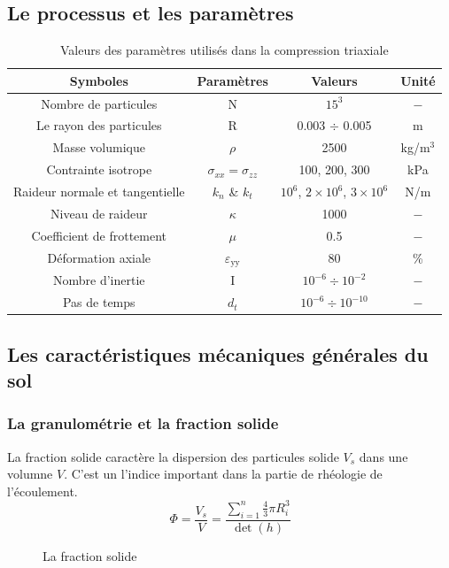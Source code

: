 \documentclass[a4paper,12pt]{report}
\begin{document}
\subsection{Le processus et les paramètres}

\begin{table}
\centering
\begin{tabular}{|c|c|c|c|}
\hline
\textbf{Symboles} & \textbf{Paramètres} & \textbf{Valeurs} & \textbf{Unité} \\ 
\hline
Nombre de particules & N & $15^3$ & $-$ \\  
\hline
Le rayon des particules & R & 0.003 $\div$ 0.005 & m \\  
\hline
Masse volumique & $\rho$  & 2500 & kg/m$^3$ \\
\hline
Contrainte isotrope & $\sigma_{xx} = \sigma_{zz}$ & 100, 200, 300 & kPa \\ 
\hline
Raideur normale et tangentielle & $k_n$ \& $k_t$ & $10^6$, $2 \times 10^6$, $3 \times 10^6$ & N/m \\ 
\hline
Niveau de raideur & $\kappa$ & 1000 & $-$ \\ 
\hline
Coefficient de frottement & $\mu$ & 0.5 & $-$ \\ 
\hline
Déformation axiale & $\varepsilon_{\text{yy}}$ &  80 & \% \\ 
\hline
Nombre d’inertie & I & $10^{-6} \div 10^{-2}$ & $-$ \\ 
\hline
Pas de temps & $d_t$  & $10^{-6} \div 10^{-10}$ & $-$\\
\hline
\end{tabular}
\caption{Valeurs des paramètres utilisés dans la compression triaxiale}
\end{table}

\subsection{Les caractéristiques mécaniques générales du sol}
\subsubsection{La granulométrie et la fraction solide}
La fraction solide caractère la dispersion des particules solide $V_s$ dans une volumne $V$. 
C'est un l'indice important dans la partie de rhéologie de l'écoulement.
\begin{equation}
\Phi = \dfrac{V_s}{V} = \dfrac{\sum\limits_{i = 1}^n \frac{4}{3}\pi R_i^3}{\det(h)}
\end{equation}
                                \begin{figure}
                                   \centering \small 
                                    \caption{La fraction solide}
                                    \label{fig:fractionSolideMax}
                                \end{figure}
\end{document}
